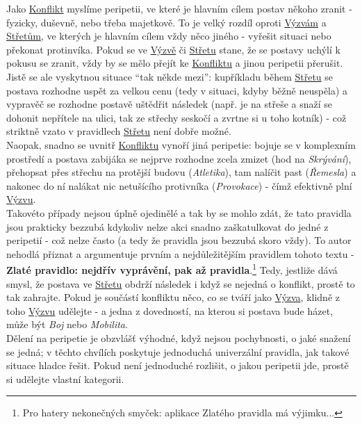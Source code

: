 \documentclass[../main.tex]{subfiles}
\begin{document}
Jako \underline{Konflikt} myslíme peripetii, ve které je hlavním cílem postav někoho zranit - fyzicky, duševně, nebo třeba majetkově. To je velký rozdíl oproti \underline{Výzvám} a \underline{Střetům}, ve kterých je hlavním cílem vždy něco jiného - vyřešit situaci nebo překonat protinvíka. Pokud se ve \underline{Výzvě} či \underline{Střetu} stane, že se postavy uchýlí k pokusu se zranit, vždy by se mělo přejít ke \underline{Konfliktu} a jinou peripetii přerušit.\\
Jistě se ale vyskytnou situace ``tak někde mezi'': kupříkladu během \underline{Střetu} se postava rozhodne uspět za velkou cenu (tedy v situaci, kdyby běžně neuspěla) a vypravěč se rozhodne postavě uštědřit následek (např. je na střeše a snaží se dohonit nepřítele na ulici, tak ze střechy seskočí a zvrtne si u toho kotník) - což striktně vzato v pravidlech \underline{Střetu} není dobře možné.\\
Naopak, snadno se uvnitř \underline{Konfliktu} vynoří jiná peripetie: bojuje se v komplexním prostředí a postava zabijáka se nejprve rozhodne zcela zmizet (hod na \textit{Skrývání}), přehopsat přes střechu na protější budovu (\textit{Atletika}), tam nalíčit past (\textit{Řemesla}) a nakonec do ní nalákat nic netušícího protivníka (\textit{Provokace}) - čímž efektivně plní \underline{Výzvu}.\\
Takovéto případy nejsou úplně ojedinělé a tak by se mohlo zdát, že tato pravidla jsou prakticky bezzubá kdykoliv nelze akci snadno zaškatulkovat do jedné z peripetií - což nelze často (a tedy že pravidla jsou bezzubá skoro vždy). To autor nehodlá přiznat a argumentuje prvním a nejdůležitějším pravidlem tohoto textu - \textbf{Zlaté pravidlo: nejdřív vyprávění, pak až pravidla}.\footnote{Pro hatery nekonečných smyček: aplikace Zlatého pravidla má výjimku...} Tedy, jestliže dává smysl, že postava ve \underline{Střetu} obdrží následek i když se nejedná o konflikt, prostě to tak zahrajte. Pokud je součástí konfliktu něco, co se tváří jako \underline{Výzva}, klidně z toho \underline{Výzvu} udělejte - a jedna z dovedností, na kterou si postava bude házet, může být \textit{Boj} nebo \textit{Mobilita}.\\

Dělení na peripetie je obzvlášť výhodné, když nejsou pochybnosti, o jaké snažení se jedná; v těchto chvílích poskytuje jednoduchá univerzální pravidla, jak takové situace hladce řešit. Pokud není jednoduché rozlišit, o jakou peripetii jde, prostě si udělejte vlastní kategorii.
\end{document}
